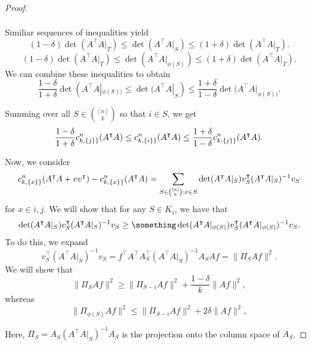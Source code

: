 \documentclass{amsart}
\theoremstyle{definition}
\numberwithin{equation}{section}
\begin{document}
\begin{proof}
\begin{align*}
    \end{align*}

    Similiar sequences of inequalities yield
    \[
        (1-\delta)\det(A^{\intercal}A|_T) \le \det(A^{\intercal}A|_S) \le (1+\delta)\det(A^{\intercal}A|_T).
    \]
    \[
        (1-\delta)\det(A^{\intercal}A|_T) \le \det(A^{\intercal}A|_{\phi(S)}) \le (1+\delta)\det(A^{\intercal}A|_T).
    \]
    We can combine these inequalities to obtain
    \[
        \frac{1-\delta}{1+\delta}\det(A^{\intercal}A|_{\phi(S))} \le \det(A^{\intercal}A|_S)\le \frac{1+\delta}{1-\delta}\det(A^{\intercal}A|_{\phi(S))}.
    \]

    Summing over all $S \in \binom{[n]}{k}$ so that $i \in S$, we get
    \[

            \frac{1-\delta}{1+\delta}\cnk{j}(A^{\intercal}A) \le \cnk{i}(A^{\intercal}A) \le \frac{1+\delta}{1-\delta}{\cnk{j}(A^{\intercal}A)}.
    \]

    Now, we consider
    \[
        c_{k, \{x\}\}}^n(A^{\intercal}A+vv^{\intercal}) - c_{k, \{x\}\}}^n(A^{\intercal}A) = \sum_{S \in \binom{[n]}{k} : x \in S} \det(A^{\intercal}A|_S) v_S^{\intercal}(A^{\intercal}A|_S)^{-1}v_S
    \]
    for $x \in i, j$. We will show that for any $S \in K_i$, we have that
    \[
         \det(A^{\intercal}A|_S) v_S^{\intercal}(A^{\intercal}A|_S)^{-1}v_S \ge \something 
         \det(A^{\intercal}A|_{\phi(S)}) v_S^{\intercal}(A^{\intercal}A|_{\phi(S)})^{-1}v_S.
    \]
    To do this, we expand 
    \[
        v_S^{\intercal}(A^{\intercal}A|_S)^{-1}v_S = 
            f^{\intercal}A^{\intercal}A_S^{\intercal}(A^{\intercal}A|_S)^{-1}A_SAf = \|\Pi_SAf\|^2.
    \]
    We will show that 
    \[
        \|\Pi_SAf\|^2 \ge \|\Pi_{S-i}Af\|^2 + \frac{1-\delta}{k}\|Af\|^2,
    \]
    whereas
    \[
        \|\Pi_{\phi(S)}Af\|^2 \le \|\Pi_{S-i}Af\|^2 + 2\delta\|Af\|^2,
    \]

    Here, $\Pi_S = A_S(A^{\intercal}A|_S)^{-1}A_S$ is the projection onto the column space of $A_S$.


\end{proof}




\end{document}
